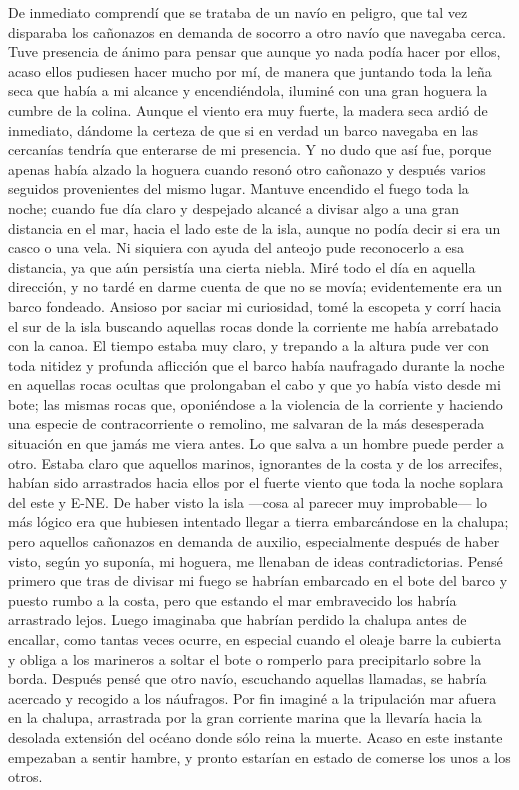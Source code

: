 \documentclass{novela}
\begin{document}
    De inmediato comprendí que se trataba de un navío en peligro, que tal vez disparaba los cañonazos en demanda de socorro a otro navío que navegaba cerca. Tuve presencia de ánimo para pensar que aunque yo nada podía hacer por ellos, acaso ellos pudiesen hacer mucho por mí, de manera que juntando toda la leña seca que había a mi alcance y encendiéndola, iluminé con una gran hoguera la cumbre de la colina. Aunque el viento era muy fuerte, la madera seca ardió de inmediato, dándome la certeza de que si en verdad un barco navegaba en las cercanías tendría que enterarse de mi presencia. Y no dudo que así fue, porque apenas había alzado la hoguera cuando resonó otro cañonazo y después varios seguidos provenientes del mismo lugar. Mantuve encendido el fuego toda la noche; cuando fue día claro y despejado alcancé a divisar algo a una gran distancia en el mar, hacia el lado este de la isla, aunque no podía decir si era un casco o una vela. Ni siquiera con ayuda del anteojo pude reconocerlo a esa distancia, ya que aún persistía una cierta niebla.
    Miré todo el día en aquella dirección, y no tardé en darme cuenta de que no se movía; evidentemente era un barco fondeado. Ansioso por saciar mi curiosidad, tomé la escopeta y corrí hacia el sur de la isla buscando aquellas rocas donde la corriente me había arrebatado con la canoa. El tiempo estaba muy claro, y trepando a la altura pude ver con toda nitidez y profunda aflicción que el barco había naufragado durante la noche en aquellas rocas ocultas que prolongaban el cabo y que yo había visto desde mi bote; las mismas rocas que, oponiéndose a la violencia de la corriente y haciendo una especie de contracorriente o remolino, me salvaran de la más desesperada situación en que jamás me viera antes.
    Lo que salva a un hombre puede perder a otro. Estaba claro que aquellos marinos, ignorantes de la costa y de los arrecifes, habían sido arrastrados hacia ellos por el fuerte viento que toda la noche soplara del este y E-NE. De haber visto la isla —cosa al parecer muy improbable— lo más lógico era que hubiesen intentado llegar a tierra embarcándose en la chalupa; pero aquellos cañonazos en demanda de auxilio, especialmente después de haber visto, según yo suponía, mi hoguera, me llenaban de ideas contradictorias. Pensé primero que tras de divisar mi fuego se habrían embarcado en el bote del barco y puesto rumbo a la costa, pero que estando el mar embravecido los habría arrastrado lejos. Luego imaginaba que habrían perdido la chalupa antes de encallar, como tantas veces ocurre, en especial cuando el oleaje barre la cubierta y obliga a los marineros a soltar el bote o romperlo para precipitarlo sobre la borda. Después pensé que otro navío, escuchando aquellas llamadas, se habría acercado y recogido a los náufragos. Por fin imaginé a la tripulación mar afuera en la chalupa, arrastrada por la gran corriente marina que la llevaría hacia la desolada extensión del océano donde sólo reina la muerte. Acaso en este instante empezaban a sentir hambre, y pronto estarían en estado de comerse los unos a los otros.
\end{document}
